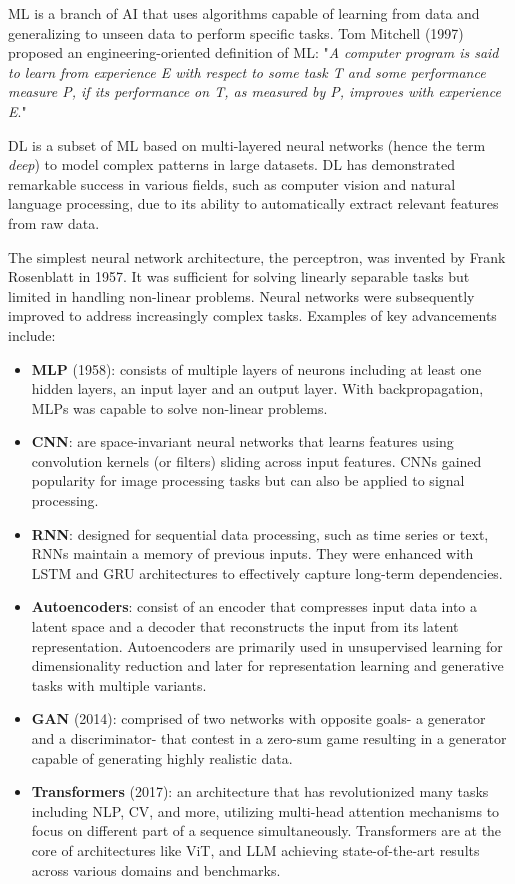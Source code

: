 \ac{ML} is a branch of \ac{AI} that uses algorithms capable of learning from data and generalizing to unseen data to perform specific tasks. Tom Mitchell (1997) proposed an engineering-oriented definition of ML: "\textit{A computer program is said to learn from experience E with respect to some task T and some performance measure P, if its performance on T, as measured by P, improves with experience E}."

\ac{DL} is a subset of ML based on multi-layered neural networks (hence the term \textit{deep}) to model complex patterns in large datasets. DL has demonstrated remarkable success in various fields, such as computer vision and natural language processing, due to its ability to automatically extract relevant features from raw data. 

The simplest neural network architecture, the perceptron, was invented by Frank Rosenblatt in 1957. It was sufficient for solving linearly separable tasks but limited in handling non-linear problems. Neural networks were subsequently improved to address increasingly complex tasks. Examples of key advancements include:
\begin{itemize}
    \item \textbf{\ac{MLP}} (1958): consists of multiple layers of neurons including at least one hidden layers, an input layer and an output layer. With backpropagation, MLPs was capable to solve non-linear problems.
    \item \textbf{\ac{CNN}}: are space-invariant neural networks that learns features using convolution kernels (or filters) sliding across input features. CNNs gained popularity for image processing tasks but can also be applied to signal processing.
    \item \textbf{\ac{RNN}}: designed for sequential data processing, such as time series or text, RNNs maintain a memory of previous inputs. They were enhanced with \ac{LSTM} and \ac{GRU} architectures to effectively capture long-term dependencies.
    \item \textbf{Autoencoders}: consist of an encoder that compresses input data into a latent space and a decoder that reconstructs the input from its latent representation. Autoencoders are primarily used in unsupervised learning for dimensionality reduction and later for representation learning and generative tasks with multiple variants.
    \item \textbf{\ac{GAN}} (2014): comprised of two networks with opposite goals- a generator and a discriminator- that contest in a zero-sum game resulting in a generator capable of generating highly realistic data.
    \item \textbf{Transformers} (2017): an architecture that has revolutionized many tasks including \ac{NLP}, \ac{CV}, and more, utilizing multi-head attention mechanisms to focus on different part of a sequence simultaneously. Transformers are at the core of architectures like \ac{ViT}, and \ac{LLM} achieving state-of-the-art results across various domains and benchmarks.
\end{itemize}


